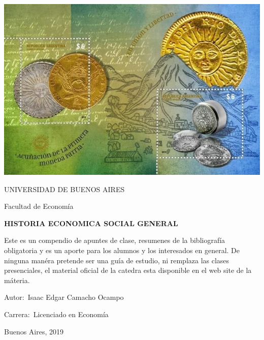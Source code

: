 \documentclass[12pt]{book}++
\begin{document}
\thispagestyle{empty}

\begin {center}

\includegraphics[scale=.4]{1484058646033.jpg}

\medskip
UNIVERSIDAD DE BUENOS AIRES

Facultad de Econom\'ia


\vspace{3cm}


\textbf{\large HISTORIA ECONOMICA SOCIAL GENERAL}

\vspace{2cm}


Este es un compendio de apuntes de clase, resumenes de la bibliograf\'ia obligatoria y es un aporte para los alumnos y los interesados en general.
De ninguna man\'era pretende ser una gu\'ia de estudio, ni remplaza las clases presenciales, el material oficial de la catedra esta disponible en el web site de la m\'ateria.
\\

\end {center}


\vspace{2.5cm}

\noindent Autor:\,	Isaac Edgar Camacho Ocampo
 
\noindent Carrera:\,	Licenciado en Econom\'ia

\vspace{1cm}

\vspace{1cm}

\noindent Buenos Aires, 2019

\newpage


\tableofcontents
\end{document}
